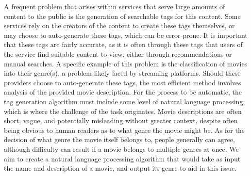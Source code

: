 A frequent problem that arises within services that serve large amounts of content to the public is the generation of searchable tags for this content. Some services rely on the creators of the content to create these tags themselves, or may choose to auto-generate these tags, which can be error-prone. It is important that these tags are fairly accurate, as it is often through these tags that users of the service find suitable content to view, either through recommendations or manual searches.
A specific example of this problem is the classification of movies into their genre(s), a problem likely faced by streaming platforms. Should these providers choose to auto-generate these tags, the most efficient method involves analysis of the provided movie description. For the process to be automatic, the tag generation algorithm must include some level of natural language processing, which is where the challenge of the task originates. Movie descriptions are often short, vague, and potentially misleading without greater context, despite often being obvious to human readers as to what genre the movie might be. As for the decision of what genre the movie itself belongs to, people generally can agree, although difficulty can result if a movie belongs to multiple genres at once.
We aim to create a natural language processing algorithm that would take as input the name and description of a movie, and output its genre to aid in this issue.